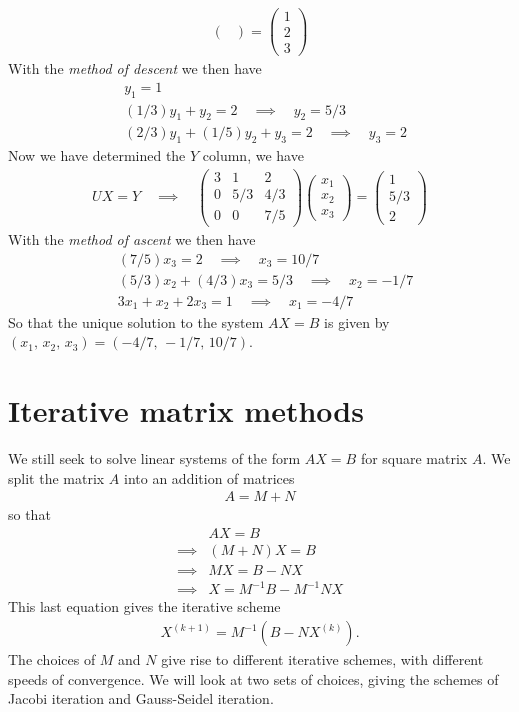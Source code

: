 {\begin{align*}
\begin{pmatrix}
\end{pmatrix}
=
\begin{pmatrix}
1 \\ 2 \\ 3
\end{pmatrix}
\end{align*}
With the \textit{method of descent} we then have
\begin{align*}
& y_1 = 1 \\
& (1/3)y_1 + y_2 = 2 \quad\implies\quad y_2 = 5/3 \\
& (2/3)y_1 +(1/5) y_2 + y_3 = 2 \quad\implies\quad y_3 = 2
\end{align*}
Now we have determined the $Y$ column, we have
\begin{align*}
UX = Y \quad\implies\quad
\begin{pmatrix}
3 & 1 & 2 \\
0 & 5/3 & 4/3 \\
0 & 0 & 7/5 
\end{pmatrix}
%
\begin{pmatrix}
x_1 \\ x_2 \\ x_3
\end{pmatrix}
%
=
%
\begin{pmatrix}
1 \\ 5/3 \\ 2
\end{pmatrix}
\end{align*}
With the \textit{method of ascent} we then have
\begin{align*}
& (7/5)x_3 = 2 \quad\implies\quad x_3 = 10/7 \\
& (5/3)x_2 + (4/3)x_3 = 5/3 \quad\implies\quad x_2 = - 1/7 \\
& 3x_1 + x_2 + 2x_3 = 1 \quad\implies\quad x_1 = -4/7
\end{align*}
So that the unique solution to the system $AX=B$ is given by $(x_1, \, x_2, \, x_3)=(-4/7, \, -1/7, \,10/7)$.
}{\downline}


\section{Iterative matrix methods}
We still seek to solve linear systems of the form $AX = B$ for square matrix $A$. We split the matrix $A$ into an addition of matrices
\begin{align*}
A = M + N
\end{align*}
so that
\begin{align*}
& AX = B  \\
\implies & (M + N)X = B  \\
\implies & MX = B - NX  \\
\implies & X = M^{-1}B - M^{-1}NX
\end{align*}
This last equation gives the iterative scheme
\begin{align*}
X^{(k+1)} = M^{-1}\left(B - NX^{(k)}\right).
\end{align*}
The choices of $M$ and $N$ give rise to different iterative schemes, with different speeds of convergence. We will look at two sets of choices, giving the schemes of Jacobi iteration and Gauss-Seidel iteration.

